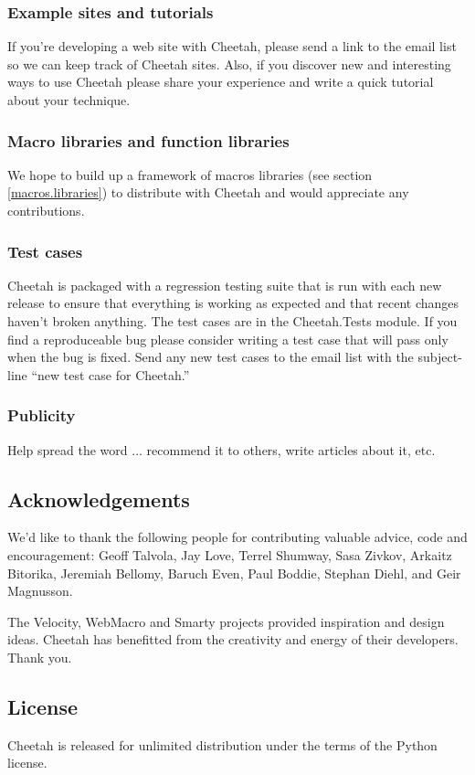 \subsubsection{Example sites and tutorials}
If you're developing a web site with Cheetah, please send a link to the
email list so we can keep track of Cheetah sites.  Also, if you discover
new and interesting ways to use Cheetah please share your experience and
write a quick tutorial about your technique.

\subsubsection{Macro libraries and function libraries}
We hope to build up a framework of macros libraries (see section
\ref{macros.libraries}) to distribute with Cheetah and would appreciate
any contributions.

\subsubsection{Test cases}
Cheetah is packaged with a regression testing suite that is run with each
new release to ensure that everything is working as expected and that recent
changes haven't broken anything.  The test cases are in the Cheetah.Tests
module.  If you find a reproduceable bug please consider writing a test case
that will pass only when the bug is fixed.  Send any new test cases to the email
list with the subject-line ``new test case for Cheetah.''

\subsubsection{Publicity}
Help spread the word ... recommend it to others, write articles about it, etc.

\subsection{Acknowledgements}
\label{intro.acknowledgments}
    
We'd like to thank the following people for contributing valuable advice, code
and encouragement: Geoff Talvola, Jay Love, Terrel Shumway, Sasa Zivkov, Arkaitz
Bitorika, Jeremiah Bellomy, Baruch Even, Paul Boddie, Stephan Diehl, and Geir
Magnusson.
    
The Velocity, WebMacro and Smarty projects provided inspiration and design
ideas.  Cheetah has benefitted from the creativity and energy of their
developers. Thank you.

\subsection{License}
\label{intro.license}

Cheetah is released for unlimited distribution under the terms of the
Python license.

